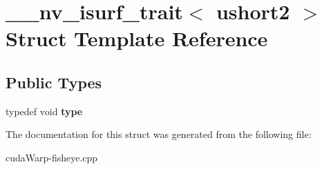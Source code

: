 \hypertarget{struct____nv__isurf__trait_3_01ushort2_01_4}{}\section{\+\_\+\+\_\+nv\+\_\+isurf\+\_\+trait$<$ ushort2 $>$ Struct Template Reference}
\label{struct____nv__isurf__trait_3_01ushort2_01_4}
\subsection*{Public Types}
\begin{DoxyCompactItemize}
\item 
typedef void {\bfseries type}\hypertarget{struct____nv__isurf__trait_3_01ushort2_01_4_a0c0c42128fff56766d3e98ec19015995}{}\label{struct____nv__isurf__trait_3_01ushort2_01_4_a0c0c42128fff56766d3e98ec19015995}

\end{DoxyCompactItemize}


The documentation for this struct was generated from the following file\+:\begin{DoxyCompactItemize}
\item 
cuda\+Warp-\/fisheye.\+cpp\end{DoxyCompactItemize}
